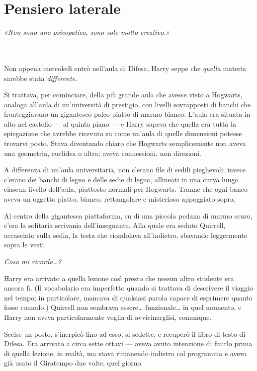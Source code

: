 
\chapter{Pensiero laterale}
\label{capitolo:16}

\emph{«Non sono uno psicopatico, sono solo molto creativo.»}

~\\
~\\

Non appena mercoledì entrò nell’aula di Difesa, Harry seppe che \textit{quella} materia sarebbe stata \textit{differente}.

Si trattava, per cominciare, della più grande aula che avesse visto a Hogwarts, analoga all’aula di un’università di prestigio, con livelli sovrapposti di banchi che fronteggiavano un gigantesco palco piatto di marmo bianco. L’aula era situata in alto nel castello — al quinto piano — e Harry sapeva che quella era tutta la spiegazione che avrebbe ricevuto su come un’aula di quelle dimensioni potesse trovarvi posto. Stava diventando chiaro che Hogwarts semplicemente non aveva una geometria, euclidea o altra; aveva connessioni, non direzioni.

A differenza di un’aula universitaria, non c’erano file di sedili pieghevoli; invece c’erano dei banchi di legno e delle sedie di legno, allineati in una curva lungo ciascun livello dell’aula, piuttosto normali per Hogwarts. Tranne che ogni banco aveva un oggetto piatto, bianco, rettangolare e misterioso appoggiato sopra.

Al centro della gigantesca piattaforma, su di una piccola pedana di marmo scuro, c’era la solitaria scrivania dell’insegnante. Alla quale era seduto Quirrell, accasciato sulla sedia, la testa che ciondolava all’indietro, sbavando leggermente sopra le vesti.

\textit{Cosa mi ricorda…?}

Harry era arrivato a quella lezione così presto che nessun altro studente era ancora lì. (Il vocabolario era imperfetto quando si trattava di descrivere il viaggio nel tempo; in particolare, mancava di qualsiasi parola capace di esprimere quanto fosse comodo.) Quirrell non sembrava essere… funzionale… in quel momento, e Harry non aveva particolarmente voglia di avvicinarglisi, comunque.

Scelse un posto, s’inerpicò fino ad esso, si sedette, e recuperò il libro di testo di Difesa. Era arrivato a circa sette ottavi — aveva avuto intenzione di finirlo prima di quella lezione, in realtà, ma stava rimanendo indietro col programma e aveva già usato il Giratempo due volte, quel giorno.

